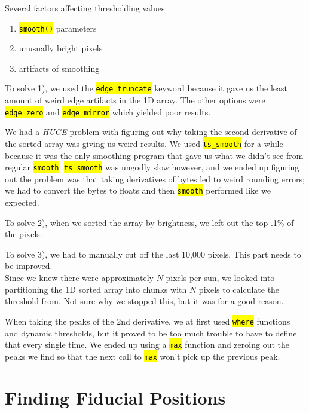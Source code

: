 \documentclass[10pt]{scrartcl}
\begin{document}
Several factors affecting thresholding values:

\begin{enumerate}
    \item \hl{\texttt{smooth()}} parameters
    \item unusually bright pixels
    \item artifacts of smoothing
\end{enumerate}

To solve 1), we used the \hl{\texttt{edge\_truncate}} keyword because it gave us the least amount of weird edge artifacts in the 1D array. The other options were \hl{\texttt{edge\_zero}} and \hl{\texttt{edge\_mirror}} which yielded poor results. 

We had a \emph{HUGE} problem with figuring out why taking the second derivative of the sorted array was giving us weird results. We used \hl{\texttt{ts\_smooth}} for a while because it was the only smoothing program that gave us what we didn't see from regular \hl{\texttt{smooth}}. \hl{\texttt{ts\_smooth}} was ungodly slow however, and we ended up figuring out the problem was that taking derivatives of bytes led to weird rounding errors; we had to convert the bytes to floats and then \hl{\texttt{smooth}} performed like we expected.

To solve 2), when we sorted the array by brightness, we left out the top .1\% of the pixels.

To solve 3), we had to manually cut off the last 10,000 pixels. This part needs to be improved.\\

Since we knew there were approximately $N$ pixels per sun, we looked into partitioning the 1D sorted array into chunks with $N$ pixels to calculate the threshold from. Not sure why we stopped this, but it was for a good reason.

When taking the peaks of the 2nd derivative, we at first used \hl{\texttt{where}} functions and dynamic thresholds, but it proved to be too much trouble to have to define that every single time. We ended up using a \hl{\texttt{max}} function and zeroing out the peaks we find so that the next call to \hl{\texttt{max}} won't pick up the previous peak.

\clearpage


\section{Finding Fiducial Positions} %
\label{sec:finding_fiducial_positions}
\end{document}
